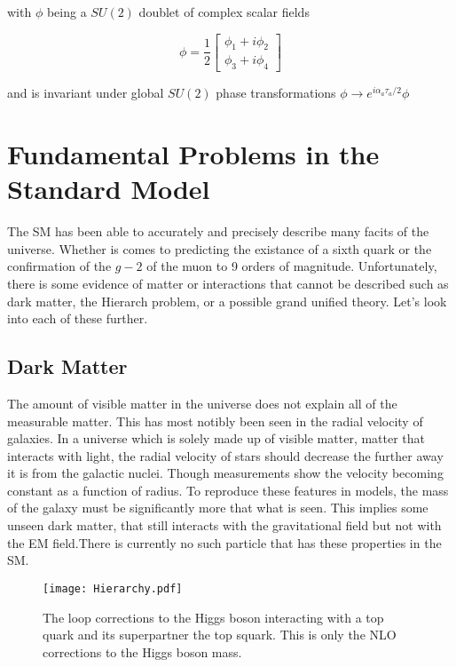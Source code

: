 with $\phi$ being a $SU(2)$ doublet of complex scalar fields

\begin{equation}
\phi=\frac{1}{2}
\begin{bmatrix}
\phi_1+i\phi_2 \\
\phi_3+i\phi_4
\end{bmatrix}
\end{equation} 

and is invariant under global $SU(2)$ phase transformations $\phi\rightarrow e^{i\alpha_a\tau_a/2}\phi$

\section{Fundamental Problems in the Standard Model}
\label{sec:SMIssues}

The SM has been able to accurately and precisely describe many facits of the universe. Whether is comes to predicting the existance of a sixth quark or the confirmation of the $g - 2$ of the muon to 9 orders of magnitude. Unfortunately, there is some evidence of matter or interactions that cannot be described such as dark matter, the Hierarch problem, or a possible grand unified theory. Let's look into each of these further.

\subsection{Dark Matter}
The amount of visible matter in the universe does not explain all of the measurable matter. This has most notibly been seen in the radial velocity of galaxies. In a universe which is solely made up of visible matter, matter that interacts with light, the radial velocity of stars should decrease the further away it is from the galactic nuclei. Though measurements show the velocity becoming constant as a function of radius. To reproduce these features in models, the mass of the galaxy must be significantly more that what is seen. This implies some unseen dark matter, that still interacts with the gravitational field but not with the EM field.There is currently no such particle that has these properties in the SM.

\begin{figure}
 	\centering
	\texttt{[image: Hierarchy.pdf]}
 	\caption{The loop corrections to the Higgs boson interacting with a top quark and its superpartner the top squark. This is only the NLO corrections to the Higgs boson mass.}
 	\label{HiggsMass} 
\end{figure}

